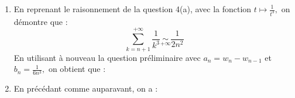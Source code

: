\documentclass[a4paper,twoside,french,10pt]{VcCours}
\begin{document}
\begin{enumerate}
\begin{enumerate}
            
            \item En reprenant le raisonnement de la question 4(a), avec la fonction $t \mapsto \frac{1}{t^3},$ on démontre que : 
        $$\sum_{k=n+1}^{+\infty}\frac{1}{k^3}\underset{+\infty}{\sim}\frac{1}{2n^2}$$
        En utilisant à nouveau la question préliminaire avec $a_n=w_n-w_{n-1}$ et $b_n=\frac{1}{6n^3},$ on obtient que :
        
            
            
            
            \item En précédant comme auparavant, on a :
        
    
    
            
        \end{enumerate}
        \end{enumerate}
    
    
    
\end{document}
